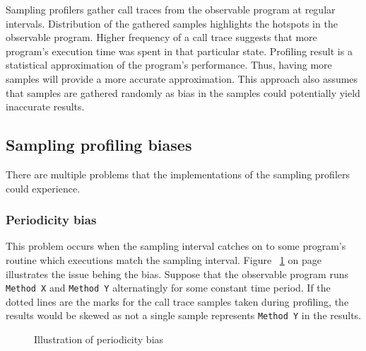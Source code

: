 \documentclass[..thesis.tex]{subfiles}
\begin{document}


Sampling profilers gather call traces from the observable program at regular intervals. Distribution of the gathered samples highlights the hotspots in the observable program. Higher frequency of a call trace suggests that more program's execution time was spent in that particular state. Profiling result is a statistical approximation of the program's performance. Thus, having more samples will provide a more accurate approximation. This approach also assumes that samples are gathered randomly as bias in the samples could potentially yield inaccurate results. 

\subsection{Sampling profiling biases}
There are multiple problems that the implementations of the sampling profilers could experience.
\subsubsection{Periodicity bias}
This problem occurs when the sampling interval catches on to some program's routine which executions match the sampling interval. Figure ~\ref{fig:periodicityBias} on page ~\pageref{fig:periodicityBias} illustrates the issue behing the bias. Suppose that the observable program runs \texttt{Method X} and \texttt{Method Y} alternatingly for some constant time period. If the dotted lines are the marks for the call trace samples taken during profiling, the results would be skewed as not a single sample represents \texttt{Method Y} in the results.

\begin{figure}[H]
\centering
{}
\caption{Illustration of periodicity bias}
\label{fig:periodicityBias}
\end{figure}
\end{document}
